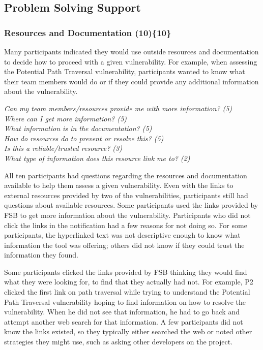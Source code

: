 \documentclass{acm_proc_article-sp}
\begin{document}
\subsection{Problem Solving Support}
\label{sec:results-pss}



\subsubsection{\textbf{Resources and Documentation (10)\{10\}}}\label{rd}

Many participants indicated they would use outside resources and documentation to decide how to proceed with a given vulnerability.
For example, when assessing the Potential Path Traversal vulnerability, participants wanted to know what their team members would do or if they could provide any additional information about the vulnerability. 


\noindent\emph{Can my team members/resources provide me with more information? (5)} \\
\emph{Where can I get more information? (5)} \\
\emph{What information is in the documentation? (5)} \\
\emph{How do resources do to prevent or resolve this? (5)} \\
\emph{Is this a reliable/trusted resource? (3)} \\
\emph{What type of information does this resource link me to? (2)}



 
All ten participants had questions regarding the resources and documentation available to help them assess a given vulnerability. 
Even with the links to external resources provided by two of the vulnerabilities, participants still had questions about available resources. 
Some participants used the links provided by FSB to get more information about the vulnerability.
Participants who did not click the links in the notification had a few reasons for not doing so.
For some participants, the hyperlinked text was not descriptive enough to know what information the tool was offering; others did not know if they could trust the information they found.

Some participants clicked the links provided by FSB thinking they would find what they were looking for, to find that they actually had not. 
For example, P2 clicked the first link on path traversal while trying to understand the Potential Path Traversal vulnerability hoping to find information on how to resolve the vulnerability.
When he did not see that information, he had to go back and attempt another web search for that information. 
A few participants did not know the links existed, so they typically either searched the web or noted other strategies they might use, such as asking other developers on the project.
\end{document}
